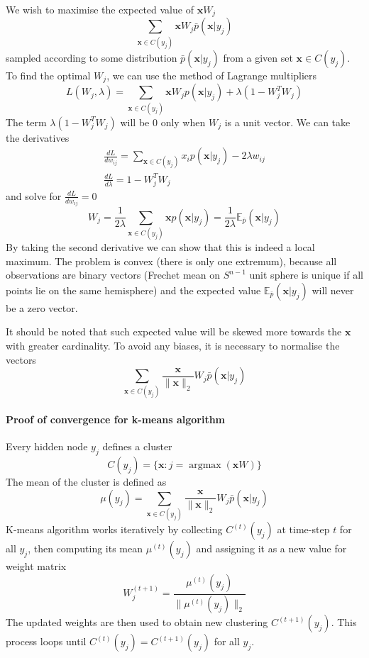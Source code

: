 \documentclass[12pt]{article}
\DeclareMathOperator*{\argmax}{argmax}
\begin{document}
We wish to maximise the expected value of $\boldsymbol{x}W_j$ 
\[
\sum_{\boldsymbol{x}\in C(y_j)} \boldsymbol{x} W_j \bar{p}(\boldsymbol{x}|y_j)
\]
sampled according to some distribution $\bar{p}(\boldsymbol{x}|y_j)$ from a given set $\boldsymbol{x}\in C(y_j)$.  To find the optimal $W_j$, we can use the method of Lagrange multipliers
\[
L(W_j,\lambda) = \sum_{\boldsymbol{x}\in C(y_j)} \boldsymbol{x} W_j p(\boldsymbol{x}|y_j) + \lambda(1- W_j^{T}W_j )
\]
The term $\lambda(1- W_j^{T}W_j)$ will be $0$ only when $W_j$ is a unit vector.
We can take the derivatives 
\begin{gather*}
	\frac{d L}{d w_{ij}} = \sum_{\boldsymbol{x}\in C(y_j)} x_i p(\boldsymbol{x}|y_j) - 2\lambda w_{ij} \\
	\frac{d L}{d \lambda} = 1 - W_j^{T}W_j
\end{gather*}
and solve for $\frac{d L}{d w_{ij}}=0$
\[
W_j = \frac{1}{2\lambda }\sum_{\boldsymbol{x}\in C(y_j)} \boldsymbol{x} p(\boldsymbol{x}|y_j)  = \frac{1}{2\lambda } \mathbb{E}_{\bar{p}}(\boldsymbol{x}|y_j)
\]
By taking the second derivative we can show that this is indeed a local maximum.
The problem is convex (there is only one extremum), because all observations are binary vectors (Frechet mean on $S^{n-1}$ unit sphere is unique if all points lie on the same hemisphere) and the expected value $\mathbb{E}_{\bar{p}}(\boldsymbol{x}|y_j)$ will never be a zero vector.

It should be noted that such expected value will be skewed more towards the $\boldsymbol{x}$ with greater cardinality. To avoid any biases, it is necessary to normalise the vectors 
\[
\sum_{\boldsymbol{x}\in C(y_j)} \frac{\boldsymbol{x}}{\lVert \boldsymbol{x} \rVert_2} W_j \bar{p}(\boldsymbol{x}|y_j)
\]



\paragraph{Proof of convergence for k-means algorithm}
Every hidden node $y_j$ defines a cluster
\[
C(y_j) = \{\boldsymbol{x} : j=\argmax(\boldsymbol{x}W)\}
\]
The mean of the cluster is defined as
\[
\mu(y_j) = \sum_{\boldsymbol{x}\in C(y_j)} \frac{\boldsymbol{x}}{\lVert \boldsymbol{x} \rVert_2} W_j \bar{p}(\boldsymbol{x}|y_j)
\]
K-means algorithm works iteratively by collecting $C^{(t)}(y_j)$ at time-step $t$ for all $y_j$, then computing its mean $\mu^{(t)}(y_j)$ and assigning it as a new value for weight matrix
\[
W_j^{(t+1)} = \frac{\mu^{(t)}(y_j)}{\lVert \mu^{(t)}(y_j) \rVert_2}
\]
The updated weights are then used to obtain new clustering $C^{(t+1)}(y_j)$. This process loops until $C^{(t)}(y_j)=C^{(t+1)}(y_j)$ for all $y_j$. 
\end{document}
